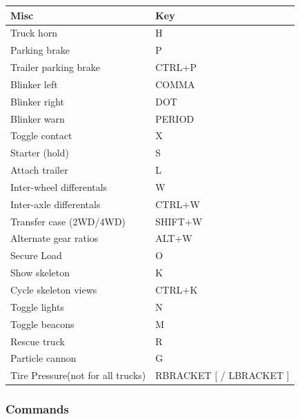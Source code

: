 \begin{tabular}{ |l|l| } 
\hline
Misc & Key \\
\hline
Truck horn & H \\
\hline
Parking brake & P \\
\hline
Trailer parking brake & CTRL+P \\
\hline
Blinker left & COMMA \\
\hline
Blinker right & DOT \\
\hline
Blinker warn & PERIOD \\
\hline
Toggle contact & X \\
\hline
Starter (hold) & S \\
\hline
Attach trailer & L \\
\hline
Inter-wheel differentals & W \\
\hline
Inter-axle differentals & CTRL+W \\
\hline
Transfer case (2WD/4WD) & SHIFT+W \\
\hline
Alternate gear ratios & ALT+W \\
\hline
Secure Load & O \\
\hline
Show skeleton & K \\
\hline
Cycle skeleton views & CTRL+K \\
\hline
Toggle lights & N \\
\hline
Toggle beacons & M \\
\hline
Rescue truck & R \\
\hline
Particle cannon & G \\
\hline
Tire Pressure(not for all trucks) & RBRACKET {[} / LBRACKET {]} \\
\hline
\end{tabular}

\hypertarget{commands}{%
\subsubsection{Commands}\label{commands}}

